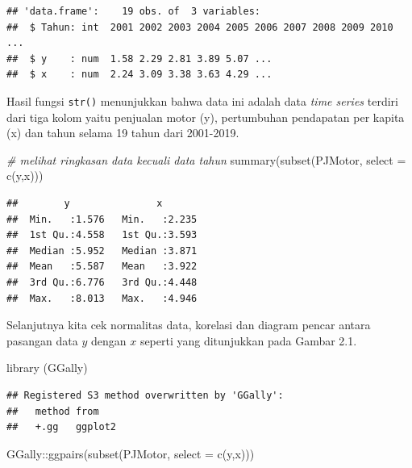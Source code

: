\documentclass[
]{book}
\newenvironment{Shaded}{\begin{snugshade}}{\end{snugshade}}
\newcommand{\AttributeTok}[1]{\textcolor[rgb]{0.77,0.63,0.00}{#1}}
\newcommand{\CommentTok}[1]{\textcolor[rgb]{0.56,0.35,0.01}{\textit{#1}}}
\newcommand{\FunctionTok}[1]{\textcolor[rgb]{0.00,0.00,0.00}{#1}}
\newcommand{\NormalTok}[1]{#1}
\newcommand{\SpecialCharTok}[1]{\textcolor[rgb]{0.00,0.00,0.00}{#1}}
\begin{document}
\begin{verbatim}
## 'data.frame':    19 obs. of  3 variables:
##  $ Tahun: int  2001 2002 2003 2004 2005 2006 2007 2008 2009 2010 ...
##  $ y    : num  1.58 2.29 2.81 3.89 5.07 ...
##  $ x    : num  2.24 3.09 3.38 3.63 4.29 ...
\end{verbatim}

Hasil fungsi \texttt{str()} menunjukkan bahwa data ini adalah data \emph{time series} terdiri dari tiga kolom yaitu penjualan motor (y), pertumbuhan pendapatan per kapita (x) dan tahun selama 19 tahun dari 2001-2019.

\begin{Shaded}
\begin{Highlighting}[]
\CommentTok{\# melihat ringkasan data kecuali data tahun}
\FunctionTok{summary}\NormalTok{(}\FunctionTok{subset}\NormalTok{(PJMotor, }\AttributeTok{select =} \FunctionTok{c}\NormalTok{(y,x)))}
\end{Highlighting}
\end{Shaded}

\begin{verbatim}
##        y               x        
##  Min.   :1.576   Min.   :2.235  
##  1st Qu.:4.558   1st Qu.:3.593  
##  Median :5.952   Median :3.871  
##  Mean   :5.587   Mean   :3.922  
##  3rd Qu.:6.776   3rd Qu.:4.448  
##  Max.   :8.013   Max.   :4.946
\end{verbatim}

Selanjutnya kita cek normalitas data, korelasi dan diagram pencar antara pasangan data \(y\) dengan \(x\) seperti yang ditunjukkan pada Gambar 2.1.

\begin{Shaded}
\begin{Highlighting}[]
\FunctionTok{library}\NormalTok{ (GGally)}
\end{Highlighting}
\end{Shaded}

\begin{verbatim}
## Registered S3 method overwritten by 'GGally':
##   method from   
##   +.gg   ggplot2
\end{verbatim}

\begin{Shaded}
\begin{Highlighting}[]
\NormalTok{GGally}\SpecialCharTok{::}\FunctionTok{ggpairs}\NormalTok{(}\FunctionTok{subset}\NormalTok{(PJMotor, }\AttributeTok{select =} \FunctionTok{c}\NormalTok{(y,x)))}
\end{Highlighting}
\end{Shaded}
\end{document}
